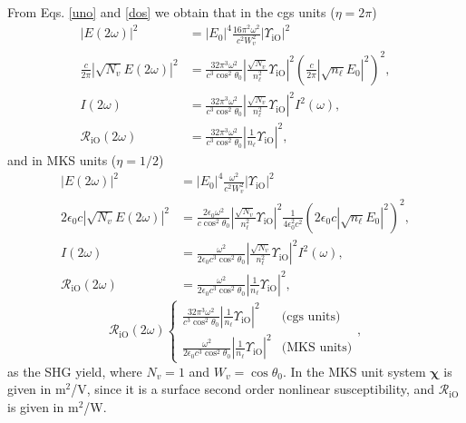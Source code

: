 From Eqs. \eqref{uno} and \eqref{dos} we obtain that
in the cgs units ($\eta=2\pi$)
\begin{align}\label{r01}
|E(2\omega)|^2 
&= |E_{0}|^4\frac{16\pi^{2}\omega^{2}}{c^{2}W^2_v}
\left\vert  
\Upsilon_{\mathrm{iO}}
\right\vert^{2}
\nonumber\\
\frac{c}{2\pi}|\sqrt{N_v}E(2\omega)|^{2} 
&=
\frac{32\pi^{3}\omega^{2}}{c^{3}\cos^2\theta_{0}}
\left\vert  
\frac{\sqrt{N_v}}{n^2_\ell}
\Upsilon_{\mathrm{iO}}
\right\vert^{2} 
\left(\frac{c}{2\pi}|\sqrt{n_\ell}E_{0}|^{2}\right)^{2},
\nonumber\\ 
I(2\omega) 
&= \frac{32\pi^{3}\omega^{2}}{c^{3}\cos^2\theta_{0}}
\left\vert  
\frac{\sqrt{N_v}}{n^2_\ell}
\Upsilon_{\mathrm{iO}}
\right\vert^{2}I^{2}(\omega),
\nonumber\\
\mathcal{R}_{\mathrm{iO}}(2\omega) 
&= 
\frac{32\pi^{3}\omega^{2}}{c^{3}\cos^2\theta_{0}}
\left\vert  
\frac{1}{n_\ell}
\Upsilon_{\mathrm{iO}}
\right\vert^{2}
,
\end{align} 
and in MKS units ($\eta=1/2$)
\begin{align}\label{r01m}
|E(2\omega)|^2 
&= |E_{0}|^4
\frac{\omega^{2}}{c^{2}W^2_v}
\left\vert  
\Upsilon_{\mathrm{iO}}
\right\vert^{2}
\nonumber\\
2\epsilon_{0}c|\sqrt{N_v}E(2\omega)|^{2} 
&=
\frac{2\epsilon_{0}\omega^{2}}{c\cos^2\theta_{0}}
\left\vert  
\frac{\sqrt{N_v}}{n^2_\ell}
\Upsilon_{\mathrm{iO}}
\right\vert^{2} 
\frac{1}{4\epsilon^2_0c^2}\left(2\epsilon_{0}c|\sqrt{n_\ell}E_{0}|^{2}\right)^{2},
\nonumber\\ 
I(2\omega) 
&= 
\frac{\omega^{2}}{2\epsilon_{0}c^3\cos^2\theta_{0}}
\left\vert  
\frac{\sqrt{N_v}}{n^2_\ell}
\Upsilon_{\mathrm{iO}}
\right\vert^{2}I^{2}(\omega),
\nonumber\\
\mathcal{R}_{\mathrm{iO}}(2\omega) 
&= \frac{\omega^{2}}{2\epsilon_{0}c^3\cos^2\theta_{0}}
\left\vert  
\frac{1}{n_\ell}
\Upsilon_{\mathrm{iO}}
\right\vert^{2} 
,
\end{align} 
\begin{equation}\label{mc6}
\mathcal{R}_{\mathrm{iO}}(2\omega) 
\left\{
\begin{array}{cc} 
\frac{32\pi^{3}\omega^{2}}{c^{3}\cos^2\theta_{0}}
\left\vert  
\frac{1}{n_\ell}
\Upsilon_{\mathrm{iO}}
\right\vert^{2} 
& \text{(cgs units)} \\
\frac{\omega^{2}}{2\epsilon_{0}c^3\cos^2\theta_{0}}
\left\vert  
\frac{1}{n_\ell}
\Upsilon_{\mathrm{iO}}
\right\vert^{2} 
& \text{(MKS units)} 
\end{array}
\right.
,
\end{equation}
as the SHG yield, where $N_v=1$ and $W_v=\cos\theta_{0}$.
In the MKS unit system $\boldsymbol{\chi}$ is given in m$^2$/V, since
it is a surface second order nonlinear susceptibility, and
$\mathcal{R}_{\mathrm{iO}}$ is given in m$^2$/W. 


